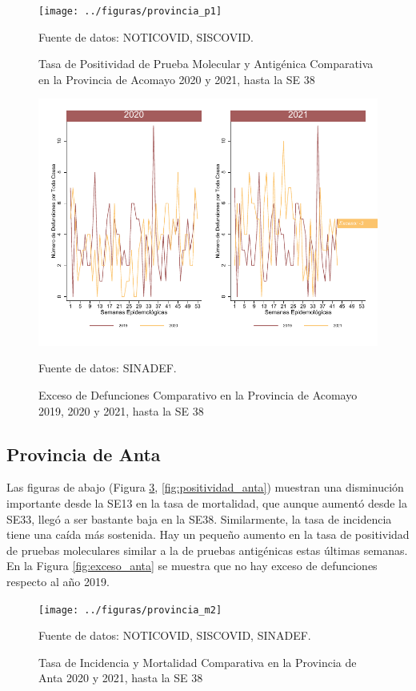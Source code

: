 \documentclass[12pt,a4paper,openany]{book}
\begin{document}
	\begin{figure}[h]
	\caption{Tasa de Positividad de Prueba Molecular y Antigénica Comparativa en la Provincia de Acomayo 2020 y 2021, hasta la SE 38}\label{fig:positividad_acomayo}
	\begin{center}
		\texttt{[image: ../figuras/provincia\_p1]}
	\end{center}
	{\footnotesize {Fuente de datos: NOTICOVID, SISCOVID.}}
	\end{figure}

	\begin{figure}[h]
	\caption{Exceso de Defunciones Comparativo en la Provincia de Acomayo 2019, 2020 y 2021, hasta la SE 38}\label{fig:exceso_acomayo}
	\begin{center}
		\includegraphics[width=0.7\linewidth]{../figuras/exceso_1}
	\end{center}
	{\footnotesize {Fuente de datos: SINADEF.}}
	\end{figure}

	\clearpage
	
	\subsection*{Provincia de Anta}
	\noindent Las figuras de abajo (Figura \ref{fig:inc_mort_anta}, \ref{fig:positividad_anta})  muestran una disminución importante desde la SE13 en la tasa de mortalidad, que aunque aumentó desde la SE33, llegó a ser bastante baja en la SE38. Similarmente, la tasa de incidencia tiene una caída más sostenida. Hay un pequeño aumento en la tasa de positividad de pruebas moleculares similar a la de pruebas antigénicas estas últimas semanas. En la Figura \ref{fig:exceso_anta} se muestra que no hay exceso de defunciones respecto al año 2019.
	
		\begin{figure}[h]
		\caption{Tasa de Incidencia y Mortalidad Comparativa en la Provincia de Anta 2020 y 2021, hasta la SE 38}\label{fig:inc_mort_anta}
		\begin{center}
			\texttt{[image: ../figuras/provincia\_m2]}
		\end{center}
		{\footnotesize {Fuente de datos: NOTICOVID, SISCOVID, SINADEF.}}
	\end{figure}
	
\end{document}
